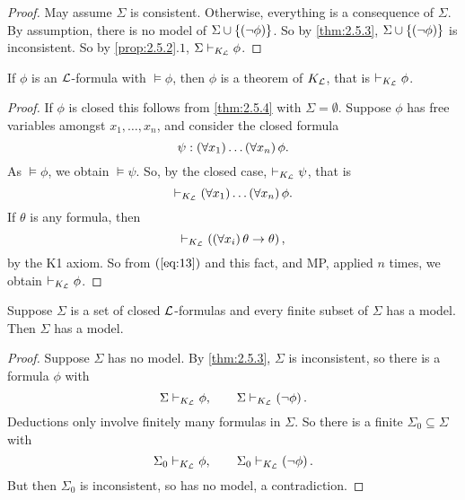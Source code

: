 \begin{proof}
May assume $ \Sigma $ is consistent. Otherwise, everything is a consequence of $ \Sigma $. By assumption, there is no model of $ \Sigma \cup \left\{ \left( \neg \phi \right) \right\} $. So by \ref{thm:2.5.3}, $ \Sigma \cup \left\{ \left( \neg \phi \right) \right\} $ is inconsistent. So by \ref{prop:2.5.2}.$ 1 $, $ \Sigma \vdash_{K_{\mathcal{L}}} \phi $.
\end{proof}

\begin{theorem}
If $ \phi $ is an $ \mathcal{L} $-formula with $ \vDash \phi $, then $ \phi $ is a theorem of $ K_{\mathcal{L}} $, that is $ \vdash_{K_{\mathcal{L}}} \phi $.
\end{theorem}

\begin{proof}
If $ \phi $ is closed this follows from \ref{thm:2.5.4} with $ \Sigma = \emptyset $. Suppose $ \phi $ has free variables amongst $ x_1, \dots, x_n $, and consider the closed formula
$$ \psi : \left( \forall x_1 \right) \dots \left( \forall x_n \right)\phi. $$
As $ \vDash \phi $, we obtain $ \vDash \psi $. So, by the closed case, $ \vdash_{K_{\mathcal{L}}} \psi $, that is
\begin{equation}
\label{eq:13}
\vdash_{K_{\mathcal{L}}} \left( \forall x_1 \right) \dots \left( \forall x_n \right)\phi.
\end{equation}
If $ \theta $ is any formula, then
$$ \vdash_{K_{\mathcal{L}}} \left( \left( \forall x_i \right)\theta \rightarrow \theta \right), $$
by the K1 axiom. So from $ \left( \ref{eq:13} \right) $ and this fact, and MP, applied $ n $ times, we obtain $ \vdash_{K_{\mathcal{L}}} \phi $.
\end{proof}

\begin{corollary}
\label{cor:2.5.6}
Suppose $ \Sigma $ is a set of closed $ \mathcal{L} $-formulas and every finite subset of $ \Sigma $ has a model. Then $ \Sigma $ has a model.
\end{corollary}

\begin{proof}
Suppose $ \Sigma $ has no model. By \ref{thm:2.5.3}, $ \Sigma $ is inconsistent, so there is a formula $ \phi $ with
$$ \Sigma \vdash_{K_{\mathcal{L}}} \phi, \qquad \Sigma \vdash_{K_{\mathcal{L}}} \left( \neg \phi \right). $$ Deductions only involve finitely many formulas in $ \Sigma $. So there is a finite $ \Sigma_0 \subseteq \Sigma $ with
$$ \Sigma_0 \vdash_{K_{\mathcal{L}}} \phi, \qquad \Sigma_0 \vdash_{K_{\mathcal{L}}} \left( \neg \phi \right). $$
But then $ \Sigma_0 $ is inconsistent, so has no model, a contradiction.
\end{proof}


